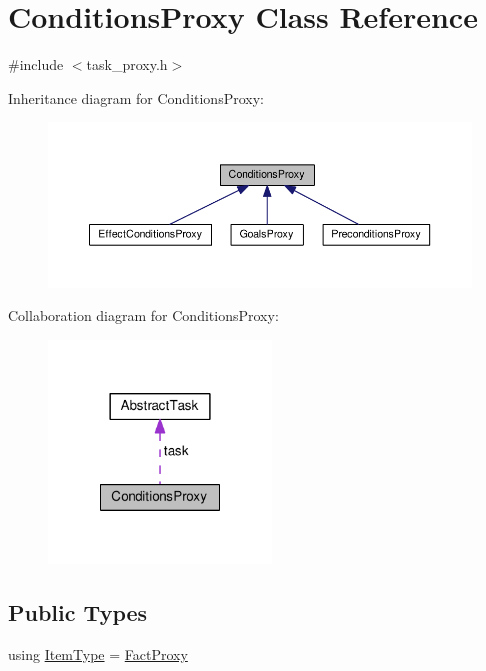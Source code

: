 \hypertarget{classConditionsProxy}{\section{Conditions\-Proxy Class Reference}
\label{classConditionsProxy}
}


{\ttfamily \#include $<$task\-\_\-proxy.\-h$>$}



Inheritance diagram for Conditions\-Proxy\-:
\nopagebreak
\begin{figure}[H]
\begin{center}
\leavevmode
\includegraphics[width=350pt]{classConditionsProxy__inherit__graph}
\end{center}
\end{figure}


Collaboration diagram for Conditions\-Proxy\-:
\nopagebreak
\begin{figure}[H]
\begin{center}
\leavevmode
\includegraphics[width=168pt]{classConditionsProxy__coll__graph}
\end{center}
\end{figure}
\subsection*{Public Types}
\begin{DoxyCompactItemize}
\item 
using \hyperlink{classConditionsProxy_a10602694ed5094da8bdc7e6e3167bf02}{Item\-Type} = \hyperlink{classFactProxy}{Fact\-Proxy}
\end{DoxyCompactItemize}
